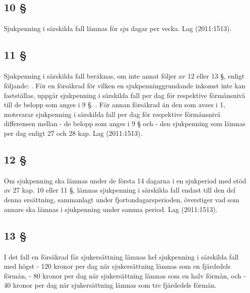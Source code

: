\documentclass[a4paper,notitlepage,openany,10pt]{book}
\begin{document}
\subsection*{10 §}
\paragraph*{}
Sjukpenning i särskilda fall lämnas för sju dagar per vecka.
Lag (2011:1513).
\subsection*{11 §}
\paragraph*{}
Sjukpenning i särskilda fall beräknas, om inte annat följer av 12 eller 13 §, enligt följande:
. För en försäkrad för vilken en sjukpenninggrundande inkomst inte kan fastställas, uppgår sjukpenning i särskilda fall per dag för respektive förmånsnivå till de belopp som anges i 9 §.
. För annan försäkrad än den som avses i 1, motsvarar sjukpenning i särskilda fall per dag för respektive förmånsnivå differensen mellan
\newline - de belopp som anges i 9 § och
\newline - den sjukpenning som lämnas per dag enligt 27 och 28 kap.
Lag (2011:1513).
\subsection*{12 §}
\paragraph*{}
Om sjukpenning ska lämnas under de första 14 dagarna i en sjukperiod med stöd av 27 kap. 10 eller 11 §, lämnas sjukpenning i särskilda fall endast till den del denna ersättning, sammanlagt under fjortondagarsperioden, överstiger vad som annars ska lämnas i sjukpenning under samma period.
Lag (2011:1513).
\subsection*{13 §}
\paragraph*{}
I det fall en försäkrad får sjukersättning lämnas hel sjukpenning i särskilda fall med högst
\newline - 120 kronor per dag när sjukersättning lämnas som en fjärdedels förmån,
\newline - 80 kronor per dag när sjukersättning lämnas som en halv förmån, och
\newline - 40 kronor per dag när sjukersättning lämnas som tre fjärdedels förmån.
\end{document}
